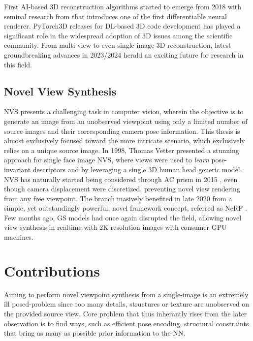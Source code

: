  First \ac{AI}-based 3D reconstruction algorithms started to emerge from 2018 with seminal research from \citep{kato2018neural} that introduces one of the first differentiable neural renderer. PyTorch3D \citep{ravi2020pytorch3d} releases for  \ac{DL}-based 3D code development has played a significant role in the widespread adoption of 3D issues among the scientific community. From multi-view \citep{li2023neuralangelo} to even single-image \citep{voleti2024sv3d} 3D reconstruction, latest groundbreaking advances in 2023/2024 herald an exciting future for research in this field. 

\subsection{Novel View Synthesis}
\ac{NVS} presents a challenging task in computer vision, wherein the objective is to generate an image from an unobserved viewpoint using only a limited number of source images and their corresponding camera pose information. This thesis is almost exclusively focused toward the more intricate scenario, which exclusively relies on a unique source image. In 1998, Thomas Vetter presented a stunning approach \cite{vetter1998synthesis} for single face image \ac{NVS}, where views were used to \textit{learn} pose-invariant descriptors and by leveraging a single 3D human head generic model. \ac{NVS} has naturally started being considered through \ac{AC} prism in 2015 \citep{yang2015weakly}, even though camera displacement were discretized, preventing novel view rendering from any free viewpoint. The branch masively benefited in late 2020 from a simple, yet outstandingly powerful, novel framework concept, referred as \ac{NeRF} \cite{mildenhall2020nerf}. Few months ago, \ac{GS} models had once again disrupted the field, allowing novel view synthesis in realtime with 2K resolution images with consumer \ac{GPU} machines. 


\section{Contributions}
Aiming to perform novel viewpoint synthesis from a single-image is an extremely ill posed-problem since too many details, structures or texture are unobserved on the provided source view. Core problem that thus inherantly rises from the later observation is to find ways, such as efficient pose encoding, structural constraints that bring as many as possible prior information to the \ac{NN}. 

